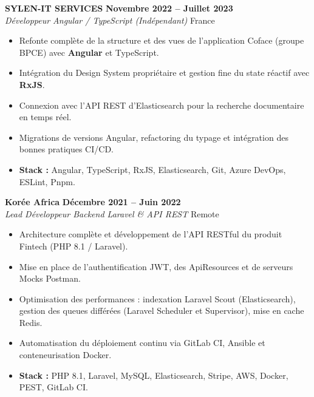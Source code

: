 \documentclass[10pt,a4paper]{article}
\begin{document}
\vspace{0.35em}

\textbf{\large SYLEN-IT SERVICES} \hfill {\bfseries\small\color{slateGray} Novembre 2022 -- Juillet 2023} \\
\emph{\color{primary}Développeur Angular / TypeScript (Indépendant)} \hfill {\small France}
\begin{itemize}[leftmargin=1.4em, itemsep=0.18em, topsep=0.15em]
    \item Refonte complète de la structure et des vues de l'application Coface (groupe BPCE) avec \textbf{Angular} et TypeScript.
    \item Intégration du Design System propriétaire et gestion fine du state réactif avec \textbf{RxJS}.
    \item Connexion avec l'API REST d'Elasticsearch pour la recherche documentaire en temps réel.
    \item Migrations de versions Angular, refactoring du typage et intégration des bonnes pratiques CI/CD.
    \item \textbf{Stack :} Angular, TypeScript, RxJS, Elasticsearch, Git, Azure DevOps, ESLint, Pnpm.
\end{itemize}

\newpage

\textbf{\large Korée Africa} \hfill {\bfseries\small\color{slateGray} Décembre 2021 -- Juin 2022} \\
\emph{\color{primary}Lead Développeur Backend Laravel \& API REST} \hfill {\small Remote}
\begin{itemize}[leftmargin=1.4em, itemsep=0.18em, topsep=0.15em]
    \item Architecture complète et développement de l'API RESTful du produit Fintech (PHP 8.1 / Laravel).
    \item Mise en place de l'authentification JWT, des ApiResources et de serveurs Mocks Postman.
    \item Optimisation des performances : indexation Laravel Scout (Elasticsearch), gestion des queues différées (Laravel Scheduler et Supervisor), mise en cache Redis.
    \item Automatisation du déploiement continu via GitLab CI, Ansible et conteneurisation Docker.
    \item \textbf{Stack :} PHP 8.1, Laravel, MySQL, Elasticsearch, Stripe, AWS, Docker, PEST, GitLab CI.
\end{itemize}

\vspace{0.35em}
\end{document}
